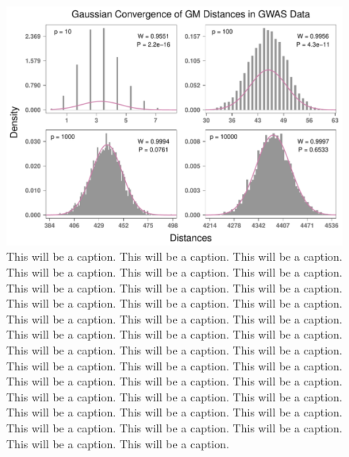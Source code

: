 \documentclass[10pt,letterpaper]{article}\usepackage[]{graphicx}\usepackage[]{color}
\begin{document}
\begin{figure}[H]
	\includegraphics[width=\textwidth]{central_limit_hist_gwas_GM.pdf}
	\caption{This will be a caption. This will be a caption. This will be a caption. This will be a caption. This will be a caption. This will be a caption. This will be a caption. This will be a caption. This will be a caption. This will be a caption. This will be a caption. This will be a caption. This will be a caption. This will be a caption. This will be a caption. This will be a caption. This will be a caption. This will be a caption. This will be a caption. This will be a caption. This will be a caption. This will be a caption. This will be a caption. This will be a caption. This will be a caption. This will be a caption. This will be a caption. This will be a caption. This will be a caption. This will be a caption. This will be a caption. This will be a caption. This will be a caption. This will be a caption. This will be a caption. This will be a caption. This will be a caption. This will be a caption.}
\end{figure}
\end{document}
